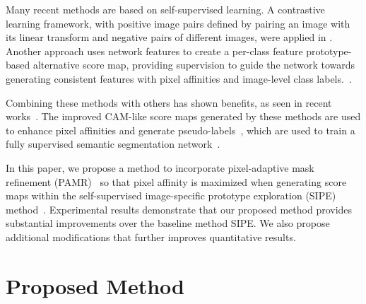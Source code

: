 \documentclass{article}
\begin{document}
Many recent methods are based on self-supervised learning. A contrastive learning framework, with positive image pairs defined by pairing an image with its linear transform and negative pairs of different images, were applied in \cite{SEAM,PPC}. Another approach uses network features to create a per-class feature prototype-based alternative score map, providing supervision to guide the network towards generating consistent features with pixel affinities and image-level class labels.~\cite{SIPE}. 

Combining these methods with others has shown benefits, as seen in recent works~\cite{SEAM,PPC,SIPE}. The improved CAM-like score maps generated by these methods are used to enhance pixel affinities and generate pseudo-labels~\cite{CRF,IRN}, which are used to train a fully supervised semantic segmentation network~\cite{DeepLabv2}.



In this paper, we propose a method to incorporate pixel-adaptive mask refinement (PAMR)~\cite{PAMR} so that pixel affinity is maximized when generating score maps within the self-supervised image-specific prototype exploration (SIPE) method~\cite{SIPE}. 
Experimental results demonstrate that our proposed method provides substantial improvements over the baseline method SIPE. 
We also propose additional modifications that further improves quantitative results.


\section{Proposed Method}
\label{sec:method}
\end{document}
